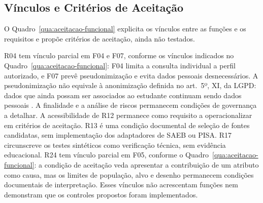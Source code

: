\subsection{Vínculos e Critérios de Aceitação}
\label{sec:aceitacao-funcional}

O Quadro~\ref{qua:aceitacao-funcional} explicita os vínculos entre as funções e os requisitos e propõe critérios de aceitação, ainda não testados.

R04 tem vínculo parcial em F04 e F07, conforme os vínculos indicados no Quadro~\ref{qua:aceitacao-funcional}: F04 limita a consulta individual a perfil autorizado, e F07 prevê pseudonimização e evita dados pessoais desnecessários. A pseudonimização não equivale à anonimização definida no art.~5º, XI, da LGPD: dados que ainda possam ser associados ao estudante continuam sendo dados pessoais \cite{LGPD2018}. A finalidade e a análise de riscos permanecem condições de governança a detalhar. A acessibilidade de R12 permanece como requisito a operacionalizar em critérios de aceitação. R13 é uma condição documental de seleção de fontes candidatas, sem implementação dos adaptadores de SAEB ou PISA. R17 circunscreve os testes sintéticos como verificação técnica, sem evidência educacional. R24 tem vínculo parcial em F05, conforme o Quadro~\ref{qua:aceitacao-funcional}: a condição de aceitação veda apresentar a contribuição de um atributo como causa, mas os limites de população, alvo e desenho permanecem condições documentais de interpretação. Esses vínculos não acrescentam funções nem demonstram que os controles propostos foram implementados.

